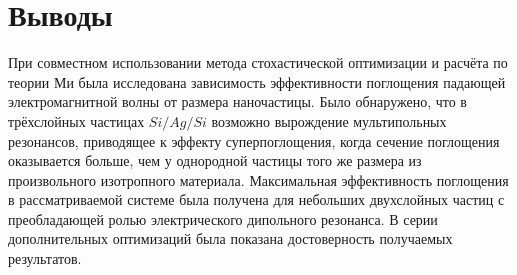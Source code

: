 \section{Выводы}

При совместном использовании метода стохастической оптимизации и
расчёта по теории Ми была исследована зависимость эффективности
поглощения падающей электромагнитной волны от размера
наночастицы. Было обнаружено, что в трёхслойных частицах $Si/Ag/Si$
возможно вырождение мультипольных резонансов, приводящее к эффекту
суперпоглощения, когда сечение поглощения оказывается больше, чем у
однородной частицы того же размера из произвольного изотропного
материала. Максимальная эффективность поглощения в рассматриваемой
системе была получена для небольших двухслойных частиц с преобладающей
ролью электрического дипольного резонанса. В серии дополнительных
оптимизаций была показана достоверность получаемых результатов.

\clearpage
